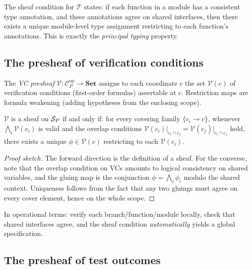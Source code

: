 \documentclass[11pt]{article}
\begin{document}
The sheaf condition for $\mathcal{T}$ states: if each function in a module has
a consistent type annotation, and these annotations agree on shared interfaces,
then there exists a unique module-level type assignment restricting to each
function's annotations.  This is exactly the \emph{principal typing} property.

\subsection{The presheaf of verification conditions}

\begin{definition}
The \emph{VC presheaf} $\mathcal{V} \colon \mathcal{C}_P^{\mathrm{op}} \to
\mathbf{Set}$ assigns to each coordinate $c$ the set $\mathcal{V}(c)$ of
verification conditions (first-order formulas) assertable at $c$.
Restriction maps are formula weakening (adding hypotheses from the enclosing
scope).
\end{definition}

\begin{theorem}[Sheaf condition = soundness]\label{thm:sheaf-sound}
$\mathcal{V}$ is a sheaf on $\mathcal{S}_P$ if and only if: for every covering
family $\{c_i \to c\}$, whenever $\bigwedge_i \mathcal{V}(c_i)$ is valid
and the overlap conditions $\mathcal{V}(c_i) \big|_{c_i \cap c_j} =
\mathcal{V}(c_j) \big|_{c_i \cap c_j}$ hold, there exists a unique
$\phi \in \mathcal{V}(c)$ restricting to each $\mathcal{V}(c_i)$.
\end{theorem}

\begin{proof}[Proof sketch]
The forward direction is the definition of a sheaf.  For the converse, note
that the overlap condition on VCs amounts to logical consistency on shared
variables, and the gluing map is the conjunction $\phi = \bigwedge_i
\phi_i$ modulo the shared context.  Uniqueness follows from the fact that
any two gluings must agree on every cover element, hence on the whole
scope.
\end{proof}

In operational terms: verify each branch/function/module locally, check that
shared interfaces agree, and the sheaf condition \emph{automatically} yields
a global specification.

\subsection{The presheaf of test outcomes}
\end{document}
